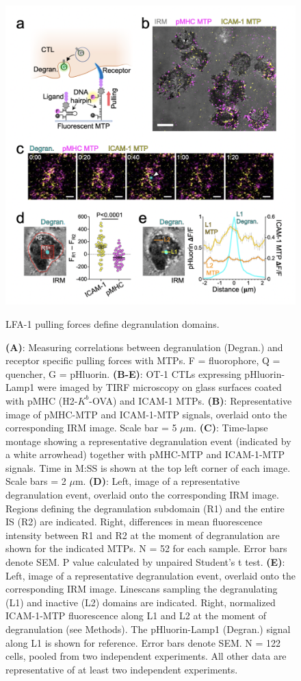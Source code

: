\begin{figure}[htbp]
	\centering
	\includegraphics[width=0.8\columnwidth]{../figures/chapter3/fig3mtp.png}
	\caption{LFA-1 pulling forces define degranulation domains.}
	\caption*{\textbf{(A)}: Measuring correlations between degranulation (Degran.) and receptor specific pulling forces with MTPs. F = fluorophore, Q = quencher, G = pHluorin. \textbf{(B-E)}: OT-1 CTLs expressing pHluorin-Lamp1 were imaged by TIRF microscopy on glass surfaces coated with pMHC (H2-$K^{b}$-OVA) and ICAM-1 MTPs. \textbf{(B)}: Representative image of pMHC-MTP and ICAM-1-MTP signals, overlaid onto the corresponding IRM image. Scale bar = 5 $\mu$m. \textbf{(C)}: Time-lapse montage showing a representative degranulation event (indicated by a white arrowhead) together with pMHC-MTP and ICAM-1-MTP signals. Time in M:SS is shown at the top left corner of each image. Scale bars = 2 $\mu$m. \textbf{(D)}: Left, image of a representative degranulation event, overlaid onto the corresponding IRM image. Regions defining the degranulation subdomain (R1) and the entire IS (R2) are indicated. Right, differences in mean fluorescence intensity between R1 and R2 at the moment of degranulation are shown for the indicated MTPs. N = 52 for each sample. Error bars denote SEM. P value calculated by unpaired Student’s t test. \textbf{(E)}: Left, image of a representative degranulation event, overlaid onto the corresponding IRM image. Linescans sampling the degranulating (L1) and inactive (L2) domains are indicated. Right, normalized ICAM-1-MTP fluorescence along L1 and L2 at the moment of degranulation (see Methods). The pHluorin-Lamp1 (Degran.) signal along L1 is shown for reference. Error bars denote SEM. N = 122 cells, pooled from two independent experiments. All other data are representative of at least two independent experiments.}
	\label{fig:fig3mtp}
\end{figure} 


